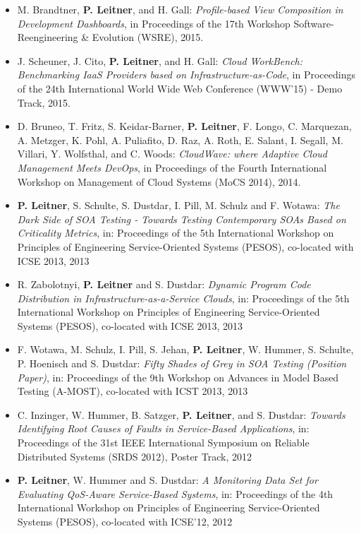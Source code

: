 \documentclass[paper=letter,fontsize=11pt]{scrartcl} %
\begin{document}
\begin{itemize}
    \item M. Brandtner, \textbf{P. Leitner}, and H. Gall: \emph{Profile-based View Composition in Development Dashboards}, in Proceedings of the 17th Workshop Software-Reengineering \& Evolution (WSRE), 2015.
  \item J. Scheuner, J. Cito, \textbf{P. Leitner}, and H. Gall: \emph{Cloud WorkBench: Benchmarking IaaS Providers based on Infrastructure-as-Code}, in Proceedings of the 24th International World Wide Web Conference (WWW'15) - Demo Track, 2015.
 \item D. Bruneo, T. Fritz, S. Keidar-Barner, \textbf{P. Leitner}, F. Longo, C. Marquezan, A. Metzger, K. Pohl, A. Puliafito, D. Raz, A. Roth, E. Salant, I. Segall, M. Villari, Y. Wolfsthal, and C. Woods: \emph{CloudWave: where Adaptive Cloud Management Meets DevOps}, in Proceedings of the Fourth International Workshop on Management of Cloud Systems (MoCS 2014), 2014.
 \item \textbf{P. Leitner}, S. Schulte, S. Dustdar, I. Pill, M. Schulz and F. Wotawa: \emph{The Dark Side of SOA Testing - Towards Testing Contemporary SOAs Based on Criticality Metrics}, in: Proceedings of the 5th International Workshop on Principles of Engineering Service-Oriented Systems (PESOS), co-located with ICSE 2013, 2013
\item R. Zabolotnyi, \textbf{P. Leitner} and S. Dustdar: \emph{Dynamic Program Code Distribution in Infrastructure-as-a-Service Clouds}, in: Proceedings of the 5th International Workshop on Principles of Engineering Service-Oriented Systems (PESOS), co-located with ICSE 2013, 2013
\item F. Wotawa, M. Schulz, I. Pill, S. Jehan, \textbf{P. Leitner}, W. Hummer, S. Schulte, P. Hoenisch and S. Dustdar: \emph{Fifty Shades of Grey in SOA Testing (Position Paper)}, in: Proceedings of the 9th Workshop on Advances in Model Based Testing (A-MOST), co-located with ICST 2013, 2013
\item C. Inzinger, W. Hummer, B. Satzger, \textbf{P. Leitner}, and S. Dustdar:
\emph{Towards Identifying Root Causes of Faults in Service-Based Applications}, in: Proceedings of the 31st IEEE International Symposium on Reliable Distributed Systems (SRDS 2012), Poster Track, 2012
\item \textbf{P. Leitner}, W. Hummer and S. Dustdar:
\emph{A Monitoring Data Set for Evaluating QoS-Aware Service-Based Systems}, in: Proceedings of the 4th International Workshop on Principles of Engineering Service-Oriented Systems (PESOS), co-located with ICSE'12, 2012

\end{itemize}
\end{document}
